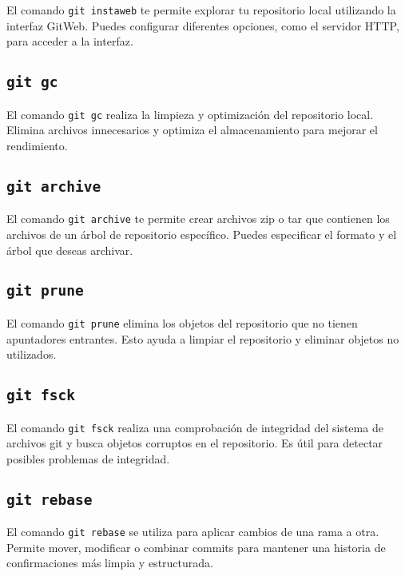 \documentclass[
  a4paper,
]{article}
\begin{document}
El comando \texttt{git\ instaweb} te permite explorar tu repositorio
local utilizando la interfaz GitWeb. Puedes configurar diferentes
opciones, como el servidor HTTP, para acceder a la interfaz.

\subsection{\texorpdfstring{\texttt{git\ gc}}{git gc}}\label{git-gc}

El comando \texttt{git\ gc} realiza la limpieza y optimización del
repositorio local. Elimina archivos innecesarios y optimiza el
almacenamiento para mejorar el rendimiento.

\subsection{\texorpdfstring{\texttt{git\ archive}}{git archive}}\label{git-archive}

El comando \texttt{git\ archive} te permite crear archivos zip o tar que
contienen los archivos de un árbol de repositorio específico. Puedes
especificar el formato y el árbol que deseas archivar.

\subsection{\texorpdfstring{\texttt{git\ prune}}{git prune}}\label{git-prune}

El comando \texttt{git\ prune} elimina los objetos del repositorio que
no tienen apuntadores entrantes. Esto ayuda a limpiar el repositorio y
eliminar objetos no utilizados.

\subsection{\texorpdfstring{\texttt{git\ fsck}}{git fsck}}\label{git-fsck}

El comando \texttt{git\ fsck} realiza una comprobación de integridad del
sistema de archivos git y busca objetos corruptos en el repositorio. Es
útil para detectar posibles problemas de integridad.

\subsection{\texorpdfstring{\texttt{git\ rebase}}{git rebase}}\label{git-rebase}

El comando \texttt{git\ rebase} se utiliza para aplicar cambios de una
rama a otra. Permite mover, modificar o combinar commits para mantener
una historia de confirmaciones más limpia y estructurada.
\end{document}
